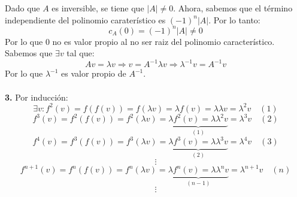 \documentclass{article}
\begin{document}
Dado que $A$ es inversible, se tiene que $|A| \ne 0$. Ahora, sabemos que el término independiente del polinomio caraterístico es $(-1)^n |A|$. Por lo tanto:
$$
c_A (0) = (-1)^n |A| \ne 0
$$
Por lo que $0$ no es valor propio al no ser raiz del polinomio característico.\\
Sabemos que $\exists v$ tal que:
$$
Av=\lambda v \Rightarrow v = A^{-1} \lambda v\Rightarrow \lambda^{-1} v = A^{-1} v
$$
Por lo que $\lambda^{-1}$ es valor propio de $A^{-1}$.\\\\
%
%
%
%
\noindent \textbf{3.} Por inducción:
$$
\exists v : f^2(v) = f(f(v)) = f(\lambda v) = \lambda f(v) = \lambda\lambda v =\lambda^2v \quad (1)
$$
$$
f^3(v) = f^2(f(v)) = f^2(\lambda v) = \underbrace{\lambda f^2(v) = \lambda \lambda^2 v}_{(1)} = \lambda^3 v \quad (2)
$$
$$
f^4(v) = f^3(f(v)) = f^3(\lambda v) = \underbrace{\lambda f^3(v) = \lambda \lambda^3 v}_{(2)} = \lambda^4 v \quad (3)
$$
$$
\vdots
$$
$$
f^{n+1}(v) = f^n(f(v)) = f^n(\lambda v) = \underbrace{\lambda f^n(v) = \lambda \lambda^n v}_{(n-1)} = \lambda^{n+1} v \quad (n)
$$
$$
\vdots
$$
\end{document}
